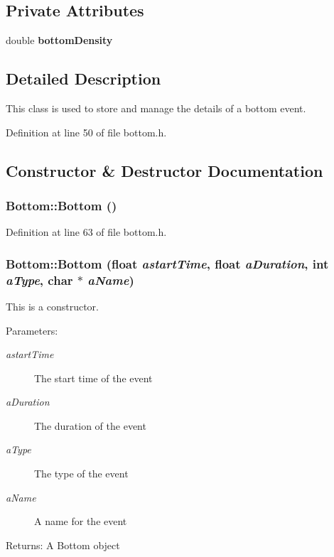 \subsection*{Private Attributes}
\begin{CompactItemize}
\item 
double {\bf bottom\-Density}
\end{CompactItemize}


\subsection{Detailed Description}
This class is used to store and manage the details of a bottom event. 



Definition at line 50 of file bottom.h.

\subsection{Constructor \& Destructor Documentation}
\subsubsection{\setlength{\rightskip}{0pt plus 5cm}Bottom::Bottom ()\hspace{0.3cm}{\tt  [inline]}}\label{classBottom_a0}




Definition at line 63 of file bottom.h.
\subsubsection{\setlength{\rightskip}{0pt plus 5cm}Bottom::Bottom (float {\em astart\-Time}, float {\em a\-Duration}, int {\em a\-Type}, char $\ast$ {\em a\-Name})}\label{classBottom_a1}


This is a constructor. \begin{Desc}
\item[Parameters:]
\begin{description}
\item[{\em astart\-Time}]The start time of the event \item[{\em a\-Duration}]The duration of the event \item[{\em a\-Type}]The type of the event \item[{\em a\-Name}]A name for the event \end{description}
\end{Desc}
\begin{Desc}
\item[Returns:]A Bottom object \end{Desc}


